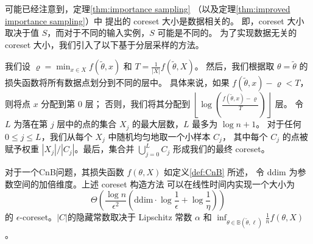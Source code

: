 可能已经注意到，定理\ref{thm:importance sampling} （以及定理\ref{thm:improved importance sampling}）中
提出的 coreset 大小是数据相关的。
即，coreset 大小取决于值 $S$，而对于不同的输入实例，$S$ 可能是不同的。
为了实现数据无关的 coreset 大小，我们引入了以下基于分层采样的方法。


我们设 $\varrho = \min_{x \in X} f(\tilde{\theta}, x)$ 和 $T = \frac{1}{|X|} f(\tilde{\theta}, X)$。
然后，我们根据取 $\theta=\tilde{\theta}$ 的损失函数将所有数据点划分到不同的层中。
具体来说，如果 $f(\tilde{\theta}, x) - \varrho < T$，则将点 $x$ 分配到第 0 层；
否则，我们将其分配到 $\left\lfloor \log \left( \frac{f(\tilde{\theta}, x) - \varrho}{T} \right) \right\rfloor$ 层。
令 $L$ 为落在第 $j$ 层中的点的集合 $X_j$ 的最大层数，$L$ 最多为 $\log n + 1$。
对于任何 $0 \leq j \leq L$，我们从每个 $X_j$ 中随机均匀地取一个小样本 $C_j$，
其中每个 $C_j$ 的点被赋予权重 $|X_j| / |C_j|$。最后，集合并 $\bigcup_{j=0}^{L} C_j$ 形成我们的最终 coreset。

\begin{theorem}
    对于一个CnB问题，其损失函数 $f(\theta, X)$ 如定义\ref{def:CnB} 所述，
    令 ddim 为参数空间的加倍维度。上述 coreset 构造方法
    可以在线性时间内实现一个大小为
    \begin{equation*}
    \Theta \left( \frac{\log n}{\epsilon^2} \left( \text{ddim} \cdot \log \frac{1}{\epsilon} + \log \frac{1}{\eta} \right) \right)
    \end{equation*}
    的 $\epsilon$-coreset。$|C|$的隐藏常数取决于 Lipschitz 常数 $\alpha$ 和 $\inf_{\theta \in \mathbb{B}(\tilde{\theta}, \ell)} \frac{1}{n} f(\theta, X)$。    
\end{theorem}

